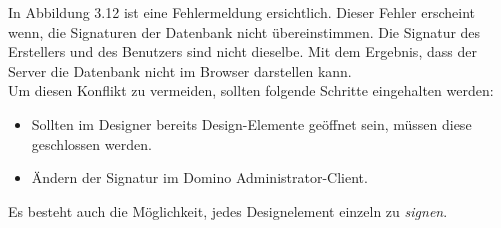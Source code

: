 In Abbildung 3.12 ist eine Fehlermeldung ersichtlich. Dieser Fehler erscheint wenn, die \linebreak Signaturen der Datenbank nicht übereinstimmen. 
Die Signatur des
Erstellers und des \linebreak Benutzers sind nicht dieselbe. Mit dem Ergebnis, dass der Server die Datenbank nicht im Browser darstellen kann. 
\\
\newline
Um diesen Konflikt zu vermeiden, sollten folgende Schritte eingehalten werden:
\begin{itemize}
\item Sollten im Designer bereits Design-Elemente geöffnet sein, müssen diese \linebreak geschlossen werden.
\item Ändern der Signatur im Domino Administrator-Client. 

\end{itemize}
\vspace{0.3cm}
Es besteht auch die Möglichkeit, jedes Designelement einzeln zu \textit{signen}.%

